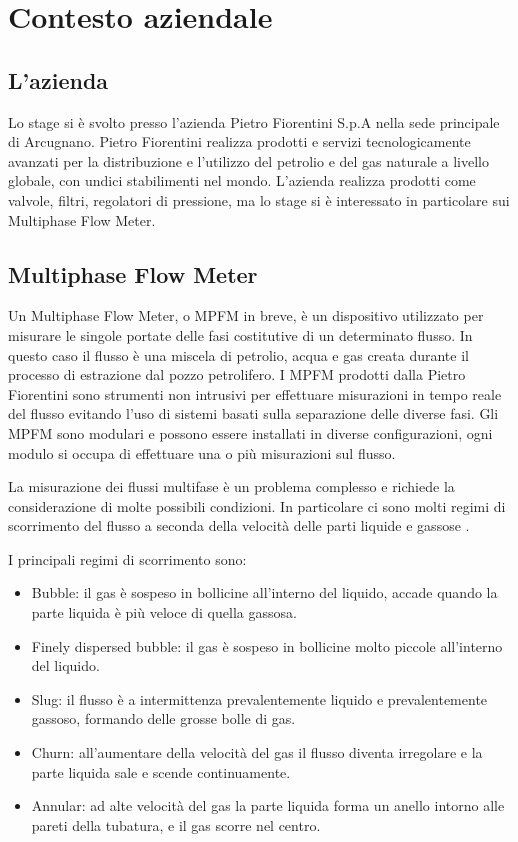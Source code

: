 
\chapter{Contesto aziendale}

\section{L'azienda}
Lo stage si è svolto presso l'azienda Pietro Fiorentini S.p.A nella sede principale di Arcugnano. Pietro Fiorentini realizza prodotti e servizi tecnologicamente avanzati per la distribuzione e l'utilizzo del petrolio e del gas naturale a livello globale, con undici stabilimenti nel mondo.
L'azienda realizza prodotti come valvole, filtri, regolatori di pressione, ma lo stage si è interessato in particolare sui Multiphase Flow Meter.

\section{Multiphase Flow Meter} \label{multiphaseflowmeter}
Un Multiphase Flow Meter, o MPFM in breve, è un dispositivo utilizzato per misurare le singole portate delle fasi costitutive di un determinato flusso. In questo caso il flusso è una miscela di petrolio, acqua e gas creata durante il processo di estrazione dal pozzo petrolifero.
I MPFM prodotti dalla Pietro Fiorentini sono strumenti non intrusivi per effettuare misurazioni in tempo reale del flusso evitando l'uso di sistemi basati sulla separazione delle diverse fasi.
Gli MPFM sono modulari e possono essere installati in diverse configurazioni, ogni modulo si occupa di effettuare una o più misurazioni sul flusso.

La misurazione dei flussi multifase è un problema complesso e richiede la considerazione di molte possibili condizioni. In particolare ci sono molti regimi di scorrimento del flusso a seconda della velocità delle parti liquide e gassose \cite{multiphaseIntroduction}.

I principali regimi di scorrimento sono:

\begin{itemize}
	\item{Bubble}: il gas è sospeso in bollicine all'interno del liquido, accade quando la parte liquida è più veloce di quella gassosa.
	\item{Finely dispersed bubble}: il gas è sospeso in bollicine molto piccole all'interno del liquido.
	\item{Slug}: il flusso è a intermittenza prevalentemente liquido e prevalentemente gassoso, formando delle grosse bolle di gas.
	\item{Churn}: all'aumentare della velocità del gas il flusso diventa irregolare e la parte liquida sale e scende continuamente.
	\item{Annular}: ad alte velocità del gas la parte liquida forma un anello intorno alle pareti della tubatura, e il gas scorre nel centro.
\end{itemize}

